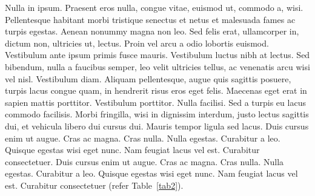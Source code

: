 \documentclass[CJCE,STIX2COL]{WileyNJD-v2}
\begin{document}
Nulla in ipsum. Praesent eros nulla, congue vitae, euismod ut, commodo a, wisi. Pellentesque habitant morbi
tristique senectus et netus et malesuada fames ac turpis egestas. Aenean nonummy magna non leo. Sed felis erat,
ullamcorper in, dictum non, ultricies ut, lectus. Proin vel arcu a odio lobortis euismod. Vestibulum ante ipsum primis fusce mauris. Vestibulum luctus nibh at lectus. Sed bibendum, nulla a faucibus semper, leo velit ultricies tellus, ac
venenatis arcu wisi vel nisl. Vestibulum diam. Aliquam pellentesque, augue quis sagittis posuere, turpis lacus congue
quam, in hendrerit risus eros eget felis. Maecenas eget erat in sapien mattis porttitor. Vestibulum porttitor. Nulla
facilisi. Sed a turpis eu lacus commodo facilisis. Morbi fringilla, wisi in dignissim interdum, justo lectus sagittis dui, et
vehicula libero dui cursus dui. Mauris tempor ligula sed lacus. Duis cursus enim ut augue. Cras ac magna. Cras nulla.
Nulla egestas. Curabitur a leo. Quisque egestas wisi eget nunc. Nam feugiat lacus vel est. Curabitur consectetuer. Duis cursus enim ut augue. Cras ac magna. Cras nulla. Nulla egestas. Curabitur a leo. Quisque egestas wisi eget nunc. Nam feugiat lacus vel est. Curabitur consectetuer  (refer Table~\ref{tab2}).

\begin{table}[t]%
\end{table}
\end{document}
